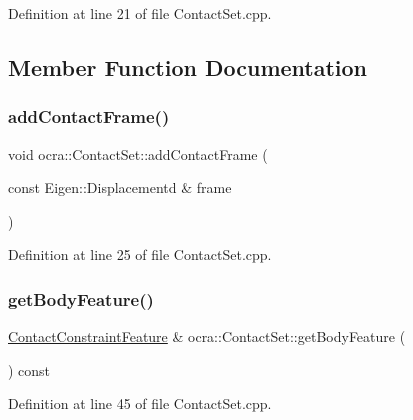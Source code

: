 Definition at line 21 of file Contact\+Set.\+cpp.



\subsection{Member Function Documentation}
\hypertarget{classocra_1_1ContactSet_ac6b33a6ece44daaa338cdf5a761b522a}{}\label{classocra_1_1ContactSet_ac6b33a6ece44daaa338cdf5a761b522a} 
\subsubsection{\texorpdfstring{add\+Contact\+Frame()}{addContactFrame()}}
{\footnotesize\ttfamily void ocra\+::\+Contact\+Set\+::add\+Contact\+Frame (\begin{DoxyParamCaption}\item[{const Eigen\+::\+Displacementd \&}]{frame }\end{DoxyParamCaption})}



Definition at line 25 of file Contact\+Set.\+cpp.

\hypertarget{classocra_1_1ContactSet_a5b1374104097c642972daabe91b4b963}{}\label{classocra_1_1ContactSet_a5b1374104097c642972daabe91b4b963} 
\subsubsection{\texorpdfstring{get\+Body\+Feature()}{getBodyFeature()}}
{\footnotesize\ttfamily \hyperlink{classocra_1_1ContactConstraintFeature}{Contact\+Constraint\+Feature} \& ocra\+::\+Contact\+Set\+::get\+Body\+Feature (\begin{DoxyParamCaption}{ }\end{DoxyParamCaption}) const}



Definition at line 45 of file Contact\+Set.\+cpp.

\hypertarget{classocra_1_1ContactSet_ae0b5d92cc7baddf61eaebd45ffe20ba3}{}\label{classocra_1_1ContactSet_ae0b5d92cc7baddf61eaebd45ffe20ba3} 
